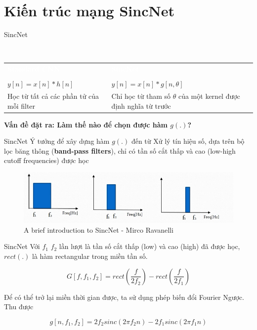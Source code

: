 \documentclass[notheorems, aspectratio=54]{beamer}
\begin{document}
\section{Kiến trúc mạng SincNet}
\begin{frame}{SincNet}
	\begin{block}{~\vspace{0.7cm}}
		\begin{center}
			\vspace{-0.8cm}
			\begin{tabular}{p{0.45\textwidth}|p{}}
				\textcolor{white}{\bf Standard CNN} & \textcolor{white}{\bf SincNet} \\\\
				 $y[n] = x[n] * h[n]$ & $y[n] = x[n] * g[n, \theta]$\\
				 Học từ tất cả các phần tử của mỗi filter & Chỉ học từ tham số $\theta$ của một kernel được định nghĩa từ trước\\
			\end{tabular}
		\end{center}
	\end{block}
	\textbf{Vấn đề đặt ra: Làm thế nào để chọn được hàm $g(.)$?}
\end{frame}
\begin{frame}{SincNet}
	Ý tưởng để xây dựng hàm $g(.)$ đến từ Xử lý tín hiệu số, dựa trên bộ lọc băng thông (\textbf{band-pass filters}), chỉ có tần số cắt thấp và cao (low-high cutoff frequencies) được học
	\begin{figure}[H]
		\includegraphics[width=0.9\linewidth]{images/band_passfilters.png}
		\caption{A brief introduction to SincNet - Mirco Ravanelli}
		\label{fig:writing-thesis}
	\end{figure}
\end{frame}
\begin{frame}{SincNet}
	Với $f_1$ $f_2$ lần lượt là tần số cắt thấp (low) và cao (high) đã được học, $rect(.)$ là hàm rectangular trong miền tần số.
	
	$$G[f, f_1, f_2] = rect\left(\frac{f}{2f_2}\right) -  rect\left(\frac{f}{2f_1}\right)$$
	
	Để có thể trở lại miền thời gian được, ta sử dụng phép biến đổi Fourier Ngược. Thu được
	
	$$g[n, f_1, f_2] = 2f_2sinc(2\pi f_2 n) - 2f_1sinc(2\pi f_1 n)$$ 
\end{frame}
\end{document}

